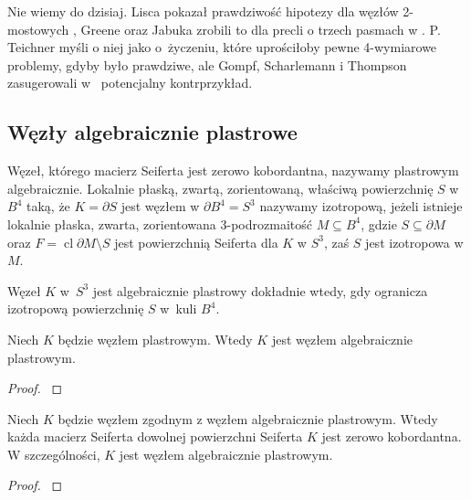 Nie wiemy do dzisiaj.
Lisca pokazał prawdziwość hipotezy dla węzłów 2-mostowych \cite{lisca07}, Greene oraz Jabuka zrobili to dla precli o trzech pasmach w \cite{greene11}.
P. Teichner myśli o niej jako o~życzeniu, które uprościłoby pewne 4-wymiarowe problemy, gdyby było prawdziwe, ale Gompf, Scharlemann i Thompson zasugerowali w~\cite{gompf10} potencjalny kontrprzykład.

\subsection{Węzły algebraicznie plastrowe}
Węzeł, którego macierz Seiferta jest zerowo kobordantna, nazywamy plastrowym algebraicznie.
Lokalnie płaską, zwartą, zorientowaną, właściwą powierzchnię $S$ w $B^4$ taką, że $K = \partial S$ jest węzłem w $\partial B^4 = S^3$ nazywamy izotropową, jeżeli istnieje lokalnie płaska, zwarta, zorientowana 3-podrozmaitość $M \subseteq B^4$, gdzie $S \subseteq \partial M$ oraz $F = \operatorname{cl} \partial M \setminus S$ jest powierzchnią Seiferta dla $K$ w $S^3$, zaś $S$ jest izotropowa w $M$.

\begin{proposition}
    Węzeł $K$ w~$S^3$ jest algebraicznie plastrowy dokładnie wtedy, gdy ogranicza izotropową powierzchnię $S$ w~kuli $B^4$.
\end{proposition}

\begin{corollary}
    Niech $K$ będzie węzłem plastrowym.
    Wtedy $K$ jest węzłem algebraicznie plastrowym.
\end{corollary}

\begin{proof}
    \cite[s. 158]{kawauchi96}
\end{proof}

\begin{proposition}
    \label{prp:cobordant_to_algebraic_is_algebraic}
    Niech $K$ będzie węzłem zgodnym z węzłem algebraicznie plastrowym.
    Wtedy każda macierz Seiferta dowolnej powierzchni Seiferta $K$ jest zerowo kobordantna.
    W szczególności, $K$ jest węzłem algebraicznie plastrowym.
\end{proposition}

\begin{proof}
    \cite[s. 159]{kawauchi96}
\end{proof}


